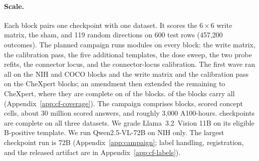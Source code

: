 \paragraph{Scale.}
Each block pairs one checkpoint with one dataset. It scores the $6\times6$ write matrix, the sham, and 119 random directions on 600 test rows (457{,}200 outcomes). The planned campaign runs \cfCoveragePlannedWord{} modules on every block: the write matrix, the calibration pass, the five additional templates, the dose sweep, the two probe refits, the connector locus, and the connector-locus calibration. The first wave ran all \cfCoveragePlannedWord{} on the NIH and COCO blocks and the write matrix and the calibration pass on the CheXpert blocks; an amendment then extended the remaining \cfCoverageChexAddedWord{} to CheXpert, where they are complete on \cfCoverageChexFull{} of the \cfCoverageChexBlocks{} blocks. \cfCoverageBlocksAllSeven{} of the \cfBlocks{} blocks carry all \cfCoveragePlannedWord{} (Appendix~\ref{app:cf-coverage}). The campaign comprises \cfBlocks{} blocks, \cfCells{} scored concept cells, about 30 million scored answers, and roughly 3{,}000 A100-hours. \cfCheckpointsCompleteWord{} checkpoints are complete on all three datasets. We grade Llama~3.2~Vision 11B on its eligible B-positive template. We run Qwen2.5-VL-72B on NIH only. The largest checkpoint run is 72B (Appendix~\ref{app:campaign}; label handling, registration, and the released artifact are in Appendix~\ref{app:cf-labels}).